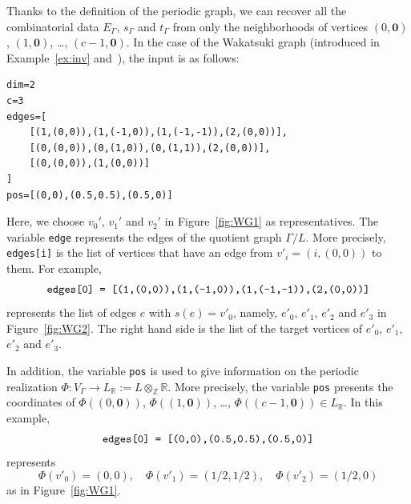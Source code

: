 Thanks to the definition of the periodic graph, we can recover all the combinatorial data $E_{\Gamma}$, $s_{\Gamma}$ and $t_{\Gamma}$ from only the neighborhoods of vertices $(0,\mathbf{0})$, $(1,\mathbf{0})$, \dots, $(c-1,\mathbf{0})$.
In the case of the Wakatsuki graph (introduced in Example~\ref{ex:inv} and~\cite[Example~2.6]{IN}), the input is as follows:
\begin{lstlisting}
dim=2
c=3
edges=[
    [(1,(0,0)),(1,(-1,0)),(1,(-1,-1)),(2,(0,0))],
    [(0,(0,0)),(0,(1,0)),(0,(1,1)),(2,(0,0))],
    [(0,(0,0)),(1,(0,0))]
]
pos=[(0,0),(0.5,0.5),(0.5,0)]
\end{lstlisting}
Here, we choose $v_0'$, $v_1'$ and $v_2'$ in Figure~\ref{fig:WG1} as representatives.
The variable \verb~edge~ represents the edges of the quotient graph $\Gamma / L$.
More precisely, \verb~edges[i]~ is the list of vertices that have an edge from $v'_i = (i,(0,0))$ to them. 
For example, 
\[
\text{\verb~edges[0] = [(1,(0,0)),(1,(-1,0)),(1,(-1,-1)),(2,(0,0))]~}
\]
represents the list of edges $e$ with $s(e) = v'_0$, namely, $e'_0$, $e'_1$, $e'_2$ and $e'_3$ in Figure~\ref{fig:WG2}. 
The right hand side is the list of the target vertices of $e'_0$, $e'_1$, $e'_2$ and $e'_3$. 


In addition, the variable \verb~pos~ is used to give information on the periodic realization $\Phi: V_{\Gamma} \to L_{\mathbb{R}} := L \otimes _{\mathbb{Z}} \mathbb{R}$. 
More precisely, the variable \verb~pos~ presents the coordinates of $\Phi\left((0,\mathbf{0})\right)$, $\Phi\left((1,\mathbf{0})\right)$, \dots, $\Phi\left((c-1,\mathbf{0})\right) \in L_{\mathbb{R}}$. 
In this example, 
\[
\text{\verb~edges[0] = [(0,0),(0.5,0.5),(0.5,0)]~}
\]
represents
\[
\Phi(v'_0) = (0,0), \quad 
\Phi(v'_1) = (1/2,1/2), \quad
\Phi(v'_2) = (1/2,0)
\]
as in Figure~\ref{fig:WG1}. 

